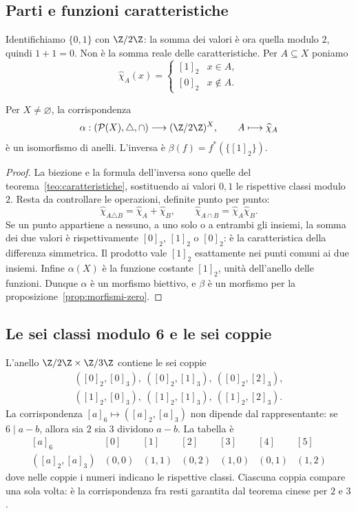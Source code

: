 \subsection{Parti e funzioni caratteristiche}
Identifichiamo $\{0,1\}$ con $\Z/2\Z$: la somma dei valori è ora quella modulo $2$, quindi $1+1=0$. Non è la somma reale delle caratteristiche. Per $A\subseteq X$ poniamo
\[
\widehat\chi_A(x)=\begin{cases}[1]_2&x\in A,\\{}[0]_2&x\notin A.\end{cases}
\]

\begin{proposizione}
Per $X\ne\varnothing$, la corrispondenza
\[
\alpha:(\mathcal P(X),\triangle,\cap)\longrightarrow(\Z/2\Z)^X,
\qquad A\longmapsto\widehat\chi_A
\]
è un isomorfismo di anelli. L'inversa è $\beta(f)=f^*(\{[1]_2\})$.
\end{proposizione}
\begin{proof}
La biezione e la formula dell'inversa sono quelle del teorema~\ref{teo:caratteristiche}, sostituendo ai valori $0,1$ le rispettive classi modulo $2$. Resta da controllare le operazioni, definite punto per punto:
\[
\widehat\chi_{A\triangle B}=\widehat\chi_A+\widehat\chi_B,
\qquad \widehat\chi_{A\cap B}=\widehat\chi_A\widehat\chi_B.
\]
Se un punto appartiene a nessuno, a uno solo o a entrambi gli insiemi, la somma dei due valori è rispettivamente $[0]_2$, $[1]_2$ o $[0]_2$: è la caratteristica della differenza simmetrica. Il prodotto vale $[1]_2$ esattamente nei punti comuni ai due insiemi. Infine $\alpha(X)$ è la funzione costante $[1]_2$, unità dell'anello delle funzioni. Dunque $\alpha$ è un morfismo biettivo, e $\beta$ è un morfismo per la proposizione~\ref{prop:morfismi-zero}.
\end{proof}

\subsection{Le sei classi modulo 6 e le sei coppie}
L'anello $\Z/2\Z\times\Z/3\Z$ contiene le sei coppie
\[
\begin{gathered}
([0]_2,[0]_3),\ ([0]_2,[1]_3),\ ([0]_2,[2]_3),\\
([1]_2,[0]_3),\ ([1]_2,[1]_3),\ ([1]_2,[2]_3).
\end{gathered}
\]
La corrispondenza $[a]_6\mapsto([a]_2,[a]_3)$ non dipende dal rappresentante: se $6\mid a-b$, allora sia $2$ sia $3$ dividono $a-b$. La tabella è
\[
\begin{array}{c|cccccc}
[a]_6&[0]&[1]&[2]&[3]&[4]&[5]\\\hline
([a]_2,[a]_3)&(0,0)&(1,1)&(0,2)&(1,0)&(0,1)&(1,2)
\end{array}
\]
dove nelle coppie i numeri indicano le rispettive classi. Ciascuna coppia compare una sola volta: è la corrispondenza fra resti garantita dal teorema cinese per $2$ e $3$.

